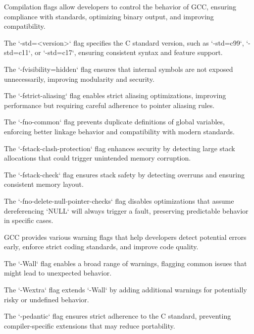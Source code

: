 \begin{NxSSSSBox}
	\begin{NxIDBox}
		Compilation flags allow developers to control the behavior of GCC, ensuring compliance with standards, optimizing binary output, and improving compatibility.
	\end{NxIDBox}
	\begin{NxIDBox}
		The `-std=<version>` flag specifies the C standard version, such as `-std=c99`, `-std=c11`, or `-std=c17`, ensuring consistent syntax and feature support.
	\end{NxIDBox}
	\begin{NxIDBox}
		The `-fvisibility=hidden` flag ensures that internal symbols are not exposed unnecessarily, improving modularity and security.
	\end{NxIDBox}
	\begin{NxIDBox}
		The `-fstrict-aliasing` flag enables strict aliasing optimizations, improving performance but requiring careful adherence to pointer aliasing rules.
	\end{NxIDBox}
	\begin{NxIDBox}
		The `-fno-common` flag prevents duplicate definitions of global variables, enforcing better linkage behavior and compatibility with modern standards.
	\end{NxIDBox}
	\begin{NxIDBox}
		The `-fstack-clash-protection` flag enhances security by detecting large stack allocations that could trigger unintended memory corruption.
	\end{NxIDBox}
	\begin{NxIDBox}
		The `-fstack-check` flag ensures stack safety by detecting overruns and ensuring consistent memory layout.
	\end{NxIDBox}
	\begin{NxIDBox}
		The `-fno-delete-null-pointer-checks` flag disables optimizations that assume dereferencing `NULL` will always trigger a fault, preserving predictable behavior in specific cases.
	\end{NxIDBox}
\end{NxSSSSBox}

\begin{NxSSSSBox}
	\begin{NxIDBox}
	GCC provides various warning flags that help developers detect potential errors early, enforce strict coding standards, and improve code quality.
	\end{NxIDBox}
	\begin{NxIDBox}
	The `-Wall` flag enables a broad range of warnings, flagging common issues that might lead to unexpected behavior.
	\end{NxIDBox}
	\begin{NxIDBox}
	The `-Wextra` flag extends `-Wall` by adding additional warnings for potentially risky or undefined behavior.
	\end{NxIDBox}
	\begin{NxIDBox}
	The `-pedantic` flag ensures strict adherence to the C standard, preventing compiler-specific extensions that may reduce portability.
	\end{NxIDBox}
\end{NxSSSSBox}

